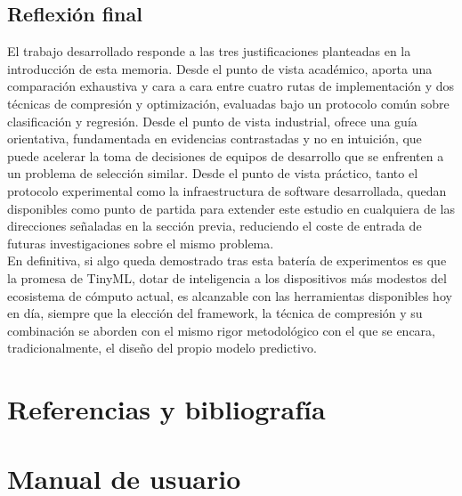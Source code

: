 \documentclass[a4paper,12pt,twoside,final]{book}
\begin{document}
\section{Reflexión final}
El trabajo desarrollado responde a las tres justificaciones planteadas en la introducción de esta memoria. Desde el
punto de vista académico, aporta una comparación exhaustiva y cara a cara entre cuatro rutas de implementación y dos
técnicas de compresión y optimización, evaluadas bajo un protocolo común sobre clasificación y regresión. Desde el
punto de vista industrial, ofrece una guía orientativa, fundamentada en evidencias contrastadas y no en intuición, que
puede acelerar la toma de decisiones de equipos de desarrollo que se enfrenten a un problema de selección similar.
Desde el punto de vista práctico, tanto el protocolo experimental como la infraestructura de software desarrollada,
quedan disponibles como punto de partida para extender este estudio en cualquiera de las direcciones señaladas en la
sección previa, reduciendo el coste de entrada de futuras investigaciones sobre el mismo problema.\\
 
En definitiva, si algo queda demostrado tras esta batería de experimentos es que la promesa de TinyML, dotar de
inteligencia a los dispositivos más modestos del ecosistema de cómputo actual, es alcanzable con las herramientas
disponibles hoy en día, siempre que la elección del framework, la técnica de compresión y su combinación se aborden
con el mismo rigor metodológico con el que se encara, tradicionalmente, el diseño del propio modelo predictivo.



%
\chapter*{Referencias y bibliografía}
%
\printbibliography[heading=none]


\appendix

\chapter{Manual de usuario}
\label{anexo:manual_usuario}
\end{document}
